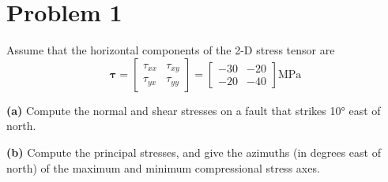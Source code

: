 \section*{Problem 1}
Assume that the horizontal components of the 2-D stress tensor are
\begin{equation*}
\boldsymbol{\tau} = 
    \begin{bmatrix}
        \tau_{xx} & \tau_{xy} \\
        \tau_{yx} & \tau_{yy}
    \end{bmatrix}
    =
    \begin{bmatrix}
        -30 & -20 \\
        -20 & -40
    \end{bmatrix}
    \text{MPa}
\end{equation*}

\textbf{(a)} Compute the normal and shear stresses on a fault that strikes 10° east of north.

\textbf{(b)} Compute the principal stresses, and give the azimuths (in degrees east of north) of the maximum and minimum compressional stress axes.

